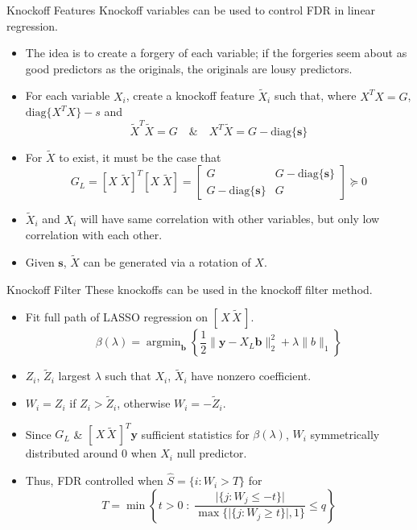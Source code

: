 \documentclass{beamer}
\newcommand{\diag}[1]{\mathrm{diag}\{#1\}}
\DeclareMathOperator*{\argmin}{arg\min}
\begin{document}
\begin{frame}{Knockoff Features}
    Knockoff variables can be used to control FDR in linear regression. 
    \begin{itemize}
        \item The idea is to create a forgery of each variable; if the forgeries seem about as good predictors as the originals, the originals are lousy predictors.
        \item For each variable $X_i$, create a knockoff feature $\tilde X_i$ such that, where $X^TX=G$, $\diag{X^T X} - s$ and 
            \[ \tilde X^T \tilde X = G \quad \& \quad X^T \tilde X = G - \diag{\mathbf s} \]
        \item For $\tilde X$ to exist, it must be the case that
            \[ G_L =[X\; \tilde X]^T[X\; \tilde X] = \left[ \begin{array}{cc} G & G - \diag{\mathbf s} \\ G - \diag{\mathbf s} & G \end{array}\right] \succeq 0 \]
        \item $\tilde X_i$ and $X_i$ will have same correlation with other variables, but only low correlation with each other.
        \item Given $\mathbf s$, $\tilde X$ can be generated via a rotation of $X$.
    \end{itemize}
\end{frame}

\begin{frame}{Knockoff Filter}
    These knockoffs can be used in the knockoff filter method. 
    \begin{itemize}
        \item Fit full path of LASSO regression on $[\,X\,\tilde X\,]$.
    \[ \beta(\lambda) = \argmin_\mathbf b \left\{\frac{1}{2}\|\mathbf y - X_L\mathbf b\|^2_2 + \lambda\|b\|_1 \right\}\]
        \item $Z_i$, $\tilde Z_i$ largest $\lambda$ such that $X_i$, $\tilde X_i$ have nonzero coefficient.
        \item $W_i= Z_i$ if $Z_i>\tilde Z_i$, otherwise $W_i = -\tilde Z_i$.
        \item Since $G_L$ \& $[\, X \, \tilde X\,]^T\mathbf y$ sufficient statistics for $\beta(\lambda)$, $W_i$ symmetrically distributed around $0$ when $X_i$ null predictor.
        \item Thus, FDR controlled when $\hat S = \{i:W_i>T\}$ for 
            \[ T = \min\left\{ t>0 \;: \; \frac{\vert\{j:W_j\leq -t\}\vert}{\max\{\vert\{j:W_j\geq t\}\vert,1\}}\leq q \right\} \]
    \end{itemize}
\end{frame}
\end{document}
